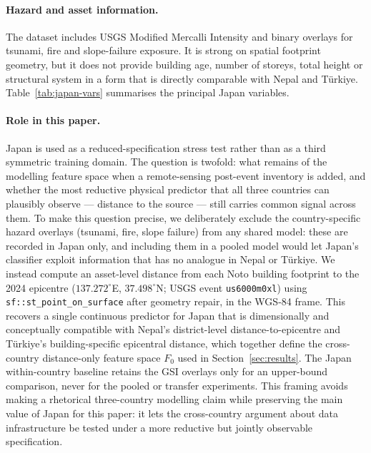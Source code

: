 \documentclass[11pt,a4paper]{article}
\begin{document}
\paragraph{Hazard and asset information.} The dataset includes USGS Modified Mercalli Intensity and binary overlays for tsunami, fire and slope-failure exposure. It is strong on spatial footprint geometry, but it does not provide building age, number of storeys, total height or structural system in a form that is directly comparable with Nepal and T\"urkiye. Table~\ref{tab:japan-vars} summarises the principal Japan variables.

\paragraph{Role in this paper.} Japan is used as a reduced-specification stress test rather than as a third symmetric training domain. The question is twofold: what remains of the modelling feature space when a remote-sensing post-event inventory is added, and whether the most reductive physical predictor that all three countries can plausibly observe --- distance to the source --- still carries common signal across them. To make this question precise, we deliberately exclude the country-specific hazard overlays (tsunami, fire, slope failure) from any shared model: these are recorded in Japan only, and including them in a pooled model would let Japan's classifier exploit information that has no analogue in Nepal or T\"urkiye. We instead compute an asset-level distance from each Noto building footprint to the 2024 epicentre ($137.272^\circ$E, $37.498^\circ$N; USGS event \texttt{us6000m0xl}) using \texttt{sf::st\_point\_on\_surface} after geometry repair, in the WGS-84 frame. This recovers a single continuous predictor for Japan that is dimensionally and conceptually compatible with Nepal's district-level distance-to-epicentre and T\"urkiye's building-specific epicentral distance, which together define the cross-country distance-only feature space $F_0$ used in Section~\ref{sec:results}. The Japan within-country baseline retains the GSI overlays only for an upper-bound comparison, never for the pooled or transfer experiments. This framing avoids making a rhetorical three-country modelling claim while preserving the main value of Japan for this paper: it lets the cross-country argument about data infrastructure be tested under a more reductive but jointly observable specification.
\end{document}
